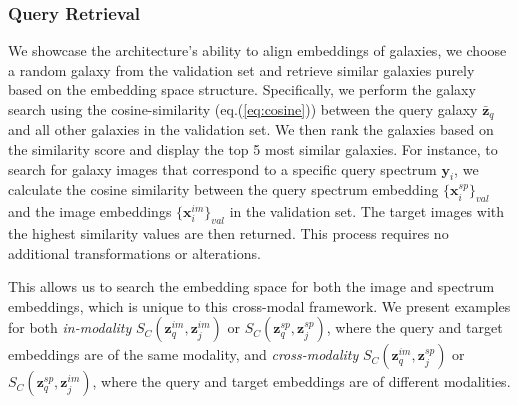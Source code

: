 \documentclass[a4paper,12pt]{article}
\begin{document}
\subsubsection*{Query Retrieval}
We showcase the architecture's ability to align embeddings of galaxies, we choose a random galaxy from the validation set and retrieve similar galaxies purely based on the embedding space structure. Specifically, we perform the galaxy search using the cosine-similarity (eq.(\ref{eq:cosine})) between the query galaxy $\bar{\mathbf{z}}_q$ and all other galaxies in the validation set. We then rank the galaxies based on the similarity score and display the top 5 most similar galaxies. For instance, to search for galaxy images that correspond to a specific query spectrum $\mathbf{y}_i$, we calculate the cosine similarity between the query spectrum embedding $\{\mathbf{x}^{sp}_i\}_{val}$ and the image embeddings $\{\mathbf{x}^{im}_i\}_{val}$ in the validation set. The target images with the highest similarity values are then returned. This process requires no additional transformations or alterations.

This allows us to search the embedding space for both the image and spectrum embeddings, which is unique to this cross-modal framework. We present examples for both \emph{in-modality} $S_{C}(\mathbf{z}^{im}_q, \mathbf{z}^{im}_j)$ or $S_{C}(\mathbf{z}^{sp}_q, \mathbf{z}^{sp}_j)$, where the query and target embeddings are of the same modality, and \emph{cross-modality} $S_{C}(\mathbf{z}^{im}_q, \mathbf{z}^{sp}_j)$ or $S_{C}(\mathbf{z}^{sp}_q, \mathbf{z}^{im}_j)$, where the query and target embeddings are of different modalities.
\end{document}
